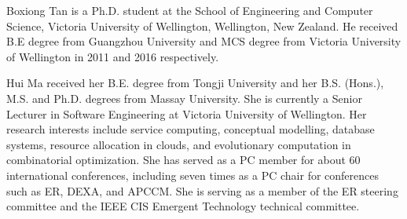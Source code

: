 \documentclass[10pt,journal,compsoc]{IEEEtran}
\begin{document}
\vspace{-5 mm}

\balance


\begin{IEEEbiography}{Boxiong Tan}
is a Ph.D. student at the School of Engineering and Computer Science, Victoria University of
Wellington, Wellington, New Zealand. He received B.E degree from Guangzhou University and MCS degree from Victoria University of
Wellington in 2011 and 2016 respectively.
\end{IEEEbiography}
\vspace{-9.5 mm}
\begin{IEEEbiography}{Hui Ma}
received her B.E. degree from Tongji University and her B.S. (Hons.), M.S. and Ph.D. degrees from Massay University. She is currently a Senior Lecturer in Software Engineering at Victoria University of Wellington. Her research interests include service computing, conceptual modelling, database systems, resource allocation in clouds, and evolutionary computation in combinatorial optimization. She has served as a PC member for about 60 international conferences, including seven times as a PC chair for conferences such as ER, DEXA, and APCCM. She is serving as a member of the ER steering committee and the IEEE CIS Emergent Technology technical committee.
\end{IEEEbiography}
\vspace{-9.5 mm}
\end{document}
